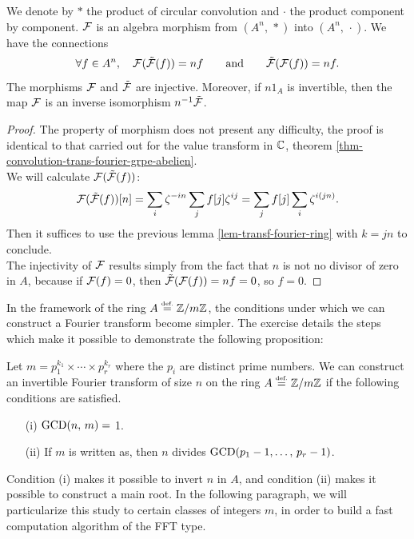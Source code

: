 \begin{thm}
We denote by $ * $ the product of circular convolution and $ \cdot $ the product component by component. $ \mathcal{F} $ is an algebra morphism from $ (A^n, \, *) $ into $ (A^n, \, \cdot) $. We have the connections
\begin{equation*}
\forall f \in A^n, \quad \mathcal{F}(\tilde{\mathcal{F}} (f)) = nf \quad \quad \text{and} \quad \quad \tilde{\mathcal{F}} (\mathcal{F}(f )) = n f.
\end{equation*}
The morphisms $ \mathcal{F} $ and $ \tilde{\mathcal{F}} $ are injective. Moreover, if $ n 1_A $ is invertible, then the map $ \mathcal{F} $ is an inverse isomorphism $ n^{-1} \tilde{\mathcal{F}} $.
\end{thm}
\begin{proof}
The property of morphism does not present any difficulty, the proof is identical to that carried out for the value transform in $ \mathbb{C} $, theorem \ref{thm-convolution-trans-fourier-grpe-abelien}. \\We will calculate $ \mathcal{F}(\tilde{\mathcal{F}} (f)) $:
\begin{equation*}
\mathcal{F}(\tilde{\mathcal{F}} (f)) [n] = \sum_i{\zeta^{- in} \sum_j{f [j] \zeta^{ij}}} = \sum_j{f [j] \sum_i{\zeta^{i (jn)}}}.
\end{equation*}
Then it suffices to use the previous lemma \ref{lem-transf-fourier-ring} with $ k = jn $ to conclude. \\The injectivity of $ \mathcal{F} $ results simply from the fact that $ n $ is not no divisor of zero in $ A $, because if $ \mathcal{F}(f) = 0 $, then $ \tilde{\mathcal{F}} (\mathcal{F}(f)) = nf = 0 $, so $ f = 0 $.
\end{proof}
In the framework of the ring $ A \stackrel{\mbox{\upshape\tiny def.}}{=} \mathbb{Z}/m \mathbb{Z} $, the conditions under which we can construct a Fourier transform become simpler. The exercise  details the steps which make it possible to demonstrate the following proposition:
 
\begin{prop}
\label{prop-cns-existance-ntt}
Let $ m = p_1^{k_1} \times \cdots \times p_r^{k_r} $ where the $ p_i $ are distinct prime numbers. We can construct an invertible Fourier transform of size $ n $ on the ring $ A \stackrel{\mbox{\upshape\tiny def.}}{=} \mathbb{Z}/m \mathbb{Z} $ if the following conditions are satisfied. \begin{itemize}
\item [{\upshape (i)}] $ \operatorname{GCD} (n, \, m) = $ 1.
\item [{\upshape (ii)}] If $ m $ is written as, then $ n $ divides $ \operatorname{GCD} (p_1-1, \ldots, \, p_r-1) $.
\end{itemize}
\end{prop}
Condition (i) makes it possible to invert $ n $ in $ A $, and condition (ii) makes it possible to construct a main  root. In the following paragraph, we will particularize this study to certain classes of integers $ m $, in order to build a fast computation algorithm of the FFT type.
